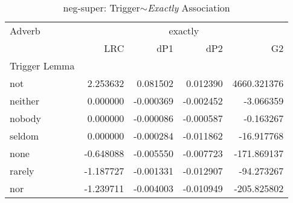 
\begin{table}[ht]
\caption{neg-super: Trigger$\sim$\textit{Exactly} Association}
\label{trigger-exactly-AM}
\begin{tabular}{lrrrr}
\toprule
Adverb & \multicolumn{4}{|c|}{exactly} \\
 & LRC & dP1 & dP2 & G2 \\
Trigger Lemma &  &  &  &  \\
\midrule
not & {\cellcolor[HTML]{67001F}} \color[HTML]{F1F1F1} 2.253632 & {\cellcolor[HTML]{67001F}} \color[HTML]{F1F1F1} 0.081502 & {\cellcolor[HTML]{67001F}} \color[HTML]{F1F1F1} 0.012390 & {\cellcolor[HTML]{67001F}} \color[HTML]{F1F1F1} 4660.321376 \\
neither & {\cellcolor[HTML]{FCD5BF}} \color[HTML]{000000} 0.000000 & {\cellcolor[HTML]{78B4D5}} \color[HTML]{000000} -0.000369 & {\cellcolor[HTML]{DBEAF2}} \color[HTML]{000000} -0.002452 & {\cellcolor[HTML]{A5CEE3}} \color[HTML]{000000} -3.066359 \\
nobody & {\cellcolor[HTML]{FCD5BF}} \color[HTML]{000000} 0.000000 & {\cellcolor[HTML]{7BB6D6}} \color[HTML]{000000} -0.000086 & {\cellcolor[HTML]{F6F7F7}} \color[HTML]{000000} -0.000587 & {\cellcolor[HTML]{A5CEE3}} \color[HTML]{000000} -0.163267 \\
seldom & {\cellcolor[HTML]{FCD5BF}} \color[HTML]{000000} 0.000000 & {\cellcolor[HTML]{78B4D5}} \color[HTML]{000000} -0.000284 & {\cellcolor[HTML]{175290}} \color[HTML]{F1F1F1} -0.011862 & {\cellcolor[HTML]{A2CDE3}} \color[HTML]{000000} -16.917768 \\
none & {\cellcolor[HTML]{F7F6F6}} \color[HTML]{000000} -0.648088 & {\cellcolor[HTML]{529DC8}} \color[HTML]{F1F1F1} -0.005550 & {\cellcolor[HTML]{569FC9}} \color[HTML]{F1F1F1} -0.007723 & {\cellcolor[HTML]{96C7DF}} \color[HTML]{000000} -171.869137 \\
rarely & {\cellcolor[HTML]{D4E6F1}} \color[HTML]{000000} -1.187727 & {\cellcolor[HTML]{71B0D3}} \color[HTML]{F1F1F1} -0.001331 & {\cellcolor[HTML]{0C3D73}} \color[HTML]{F1F1F1} -0.012907 & {\cellcolor[HTML]{9DCBE1}} \color[HTML]{000000} -94.273267 \\
nor & {\cellcolor[HTML]{D1E5F0}} \color[HTML]{000000} -1.239711 & {\cellcolor[HTML]{5FA5CD}} \color[HTML]{F1F1F1} -0.004003 & {\cellcolor[HTML]{2065AB}} \color[HTML]{F1F1F1} -0.010949 & {\cellcolor[HTML]{90C4DD}} \color[HTML]{000000} -205.825802 \\

\end{tabular}
\end{table}
